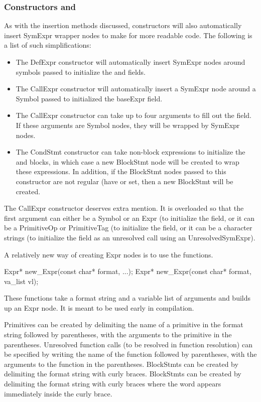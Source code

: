 \documentclass[10pt]{article}
\begin{document}
\subsubsection{Constructors and }
\label{sec:constructors}

As with the insertion methods discussed, constructors will also
automatically insert SymExpr wrapper nodes to make for more readable
code.  The following is a list of such simplifications:
\begin{itemize}
\item The DefExpr constructor will automatically insert SymExpr nodes
  around symbols passed to initialize the  and 
  fields.
\item The CallExpr constructor will automatically insert a SymExpr
  node around a Symbol passed to initialized the baseExpr field.
\item The CallExpr constructor can take up to four arguments to fill
  out the  field.  If these arguments are Symbol nodes,
  they will be wrapped by SymExpr nodes.
\item The CondStmt constructor can take non-block expressions to
  initialize the  and  blocks, in which case
  a new BlockStmt node will be created to wrap these expressions.  In
  addition, if the BlockStmt nodes passed to this constructor are not
  regular (have  or  set, then a new
  BlockStmt will be created.
\end{itemize}

The CallExpr constructor deserves extra mention.  It is overloaded so
that the first argument can either be a Symbol or an Expr (to
initialize the  field, or it can be a PrimitiveOp or
PrimitiveTag (to initialize the  field, or it can be a
character strings (to initialize the  field as an
unresolved call using an UnresolvedSymExpr).

A relatively new way of creating Expr nodes is to use the
 functions.
\begin{clang}
Expr* new_Expr(const char* format, ...);
Expr* new_Expr(const char* format, va_list vl);
\end{clang}
These functions take a format string and a variable list of arguments
and builds up an Expr node.  It is meant to be used early in
compilation.

Primitives can be created by delimiting the name of a primitive in the
format string followed by parentheses, with the arguments to the
primitive in the parentheses.  Unresolved function calls (to be
resolved in function resolution) can be specified by writing the name
of the function followed by parentheses, with the arguments to the
function in the parentheses.  BlockStmts can be created by delimiting
the format string with curly braces.   BlockStmts can
be created by delimiting the format string with curly braces where the
word  appears immediately inside the curly brace.
\end{document}
